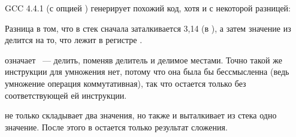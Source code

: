 
GCC 4.4.1 (с опцией \Othree) генерирует похожий код, хотя и с некоторой разницей:



Разница в том, что в стек сначала заталкивается 3,14 (в ), а затем значение 
из  делится на то, что лежит в регистре .

\FDIVR означает ~--- делить, поменяв делитель и делимое местами. 
Точно такой же инструкции для умножения нет, потому что она была бы бессмысленна (ведь умножение 
операция коммутативная), так что остается только \FMUL без соответствующей ей  инструкции.

\FADDP не только складывает два значения, но также и выталкивает из стека одно значение. 
После этого в  остается только результат сложения.
